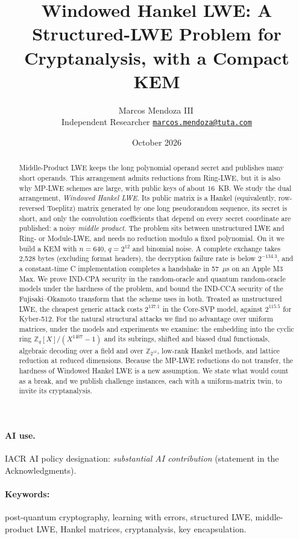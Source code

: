 \documentclass[11pt,a4paper]{article}
\title{\textbf{Windowed Hankel LWE: A Structured-LWE Problem for Cryptanalysis, with a Compact KEM}}
\author{Marcos Mendoza III\,\orcidlink{0009-0001-7723-4505}\\ \small Independent Researcher \quad \href{mailto:marcos.mendoza@tuta.com}{\texttt{marcos.mendoza@tuta.com}}}
\date{October 2026}
\theoremstyle{definition}
\newcommand{\Z}{\mathbb{Z}}
\newcommand{\Zq}{\mathbb{Z}_q}
\begin{document}
\maketitle

\begin{abstract}
Middle-Product LWE keeps the long polynomial operand secret and publishes many short operands. This arrangement admits reductions from Ring-LWE, but it is also why MP-LWE schemes are large, with public keys of about 16~KB. We study the dual arrangement, \emph{Windowed Hankel LWE}. Its public matrix is a Hankel (equivalently, row-reversed Toeplitz) matrix generated by one long pseudorandom sequence, its secret is short, and only the convolution coefficients that depend on every secret coordinate are published: a noisy \emph{middle product}. The problem sits between unstructured LWE and Ring- or Module-LWE, and needs no reduction modulo a fixed polynomial. On it we build a KEM with $n = 640$, $q = 2^{12}$ and binomial noise. A complete exchange takes 2{,}528 bytes (excluding format headers), the decryption failure rate is below $2^{-134.3}$, and a constant-time C implementation completes a handshake in 57~$\mu$s on an Apple M3 Max. We prove IND-CPA security in the random-oracle and quantum random-oracle models under the hardness of the problem, and bound the IND-CCA security of the Fujisaki--Okamoto transform that the scheme uses in both. Treated as unstructured LWE, the cheapest generic attack costs $2^{137.1}$ in the Core-SVP model, against $2^{115.5}$ for Kyber-512. For the natural structural attacks we find no advantage over uniform matrices, under the models and experiments we examine: the embedding into the cyclic ring $\Zq[X]/(X^{1407} - 1)$ and its subrings, shifted and biased dual functionals, algebraic decoding over a field and over $\Z_{2^{12}}$, low-rank Hankel methods, and lattice reduction at reduced dimensions. Because the MP-LWE reductions do not transfer, the hardness of Windowed Hankel LWE is a new assumption. We state what would count as a break, and we publish challenge instances, each with a uniform-matrix twin, to invite its cryptanalysis.
\end{abstract}

\paragraph{AI use.} IACR AI policy designation: \emph{substantial AI contribution} (statement in the Acknowledgments).

\paragraph{Keywords:} post-quantum cryptography, learning with errors, structured LWE, middle-product LWE, Hankel matrices, cryptanalysis, key encapsulation.
\end{document}
